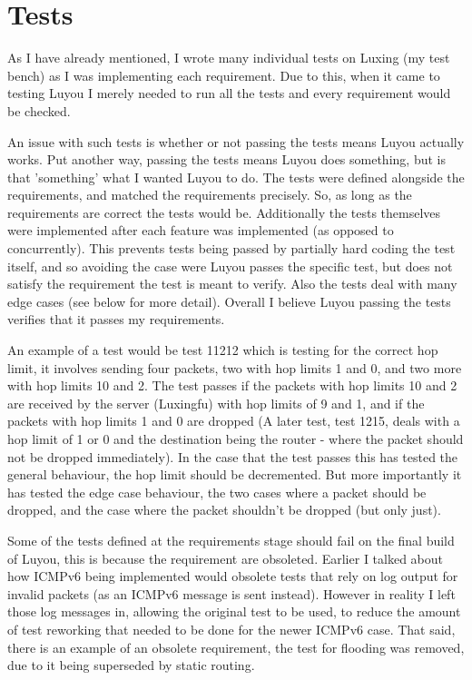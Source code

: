 \documentclass[12pt,a4paper,twoside,openright]{report}
\begin{document}
\section{Tests}

As I have already mentioned, I wrote many individual tests on Luxing (my test bench) as I was implementing each requirement.  Due to this, when it came to testing Luyou I merely needed to run all the tests and every requirement would be checked.

\bigskip

An issue with such tests is whether or not passing the tests means Luyou actually works. Put another way, passing the tests means Luyou does something, but is that 'something' what I wanted Luyou to do.  The tests were defined alongside the requirements, and matched the requirements precisely.  So, as long as the requirements are correct the tests would be.  Additionally the tests themselves were implemented after each feature was implemented (as opposed to concurrently).  This prevents tests being passed by partially hard coding the test itself, and so avoiding the case were Luyou passes the specific test, but does not satisfy the requirement the test is meant to verify. Also the tests deal with many edge cases (see below for more detail). Overall I believe Luyou passing the tests verifies that it passes my requirements.

\bigskip

An example of a test would be test 11212 which is testing for the correct hop limit, it involves sending four packets, two with hop limits 1 and 0, and two more with hop limits 10 and 2.  The test passes if the packets with hop limits 10 and 2 are received by the server (Luxingfu) with hop limits of 9 and 1, and if the packets with hop limits 1 and 0 are dropped (A later test, test 1215, deals with a hop limit of 1 or 0 and the destination being the router - where the packet should not be dropped immediately).  In the case that the test passes this has tested the general behaviour, the hop limit should be decremented. But more importantly it has tested the edge case behaviour, the two cases where a packet should be dropped, and the case where the packet shouldn't be dropped (but only just).

\bigskip

Some of the tests defined at the requirements stage should fail on the final build of Luyou, this is because the requirement are obsoleted. Earlier I talked about how ICMPv6 being implemented would obsolete tests that rely on log output for invalid packets (as an ICMPv6 message is sent instead). However in reality I left those log messages in, allowing the original test to be used, to reduce the amount of test reworking that needed to be done for the newer ICMPv6 case.  That said, there is an example of an obsolete requirement, the test for flooding was removed, due to it being superseded by static routing. 
\end{document}
